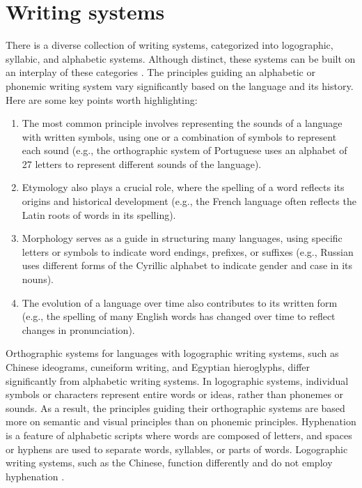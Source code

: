 \section{Writing systems}\label{sec-writing-systems}

There is a diverse collection of writing systems, categorized into logographic,
syllabic, and alphabetic systems. Although distinct, these systems can be built
on an interplay of these categories \parencite{coulmas2003,palmer2010}. 
The principles guiding an alphabetic or phonemic writing system vary significantly 
based on the language and its history. Here are some key points worth highlighting:
\begin{enumerate}[label=\arabic*)]
    \item The most common principle involves representing the sounds of a
	language with written symbols, using one or a combination of symbols to
	represent each sound (e.g., the orthographic system of Portuguese uses
	an alphabet of 27 letters to represent different sounds of the
	language).
    \item Etymology also plays a crucial role, where the spelling of a word
	reflects its origins and historical development (e.g., the French
	language often reflects the Latin roots of words in its spelling).
    \item Morphology serves as a guide in structuring many languages, using
	specific letters or symbols to indicate word endings, prefixes, or
	suffixes (e.g., Russian uses different forms of the Cyrillic alphabet
	to indicate gender and case in its nouns).
    \item The evolution of a language over time also contributes to its written
	form (e.g., the spelling of many English words has changed over time to
	reflect changes in pronunciation).
\end{enumerate}
Orthographic systems for languages with logographic writing systems, such as
Chinese ideograms, cuneiform writing, and Egyptian hieroglyphs, differ
significantly from alphabetic writing systems. In logographic systems,
individual symbols or characters represent entire words or ideas, rather than
phonemes or sounds. As a result, the principles guiding their orthographic
systems are based more on semantic and visual principles than on phonemic
principles.
Hyphenation is a feature of alphabetic scripts where words are composed of letters, 
and spaces or hyphens are used to separate words, syllables, or parts of words. 
Logographic writing systems, such as the Chinese, 
function differently and do not employ hyphenation \parencite{honorof2006}.



